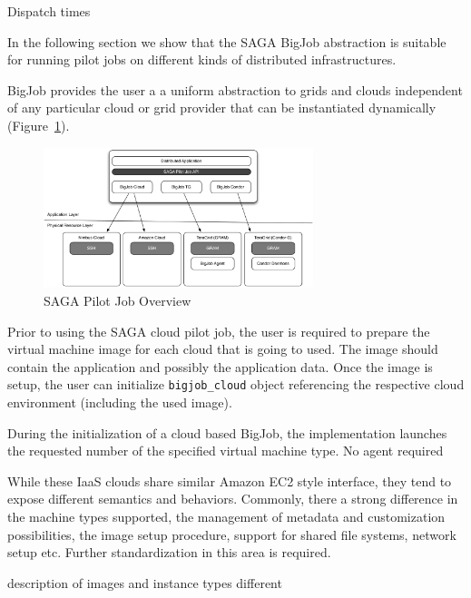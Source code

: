 \documentclass[conference,final]{IEEEtran}
\begin{document}
Dispatch times

In the following section we show that the SAGA BigJob abstraction is suitable for running pilot jobs on
different kinds of distributed infrastructures.




BigJob provides the user a a uniform abstraction to grids and clouds independent of 
any particular cloud or grid provider that can be instantiated dynamically 
(Figure~\ref{fig:figures_distributed_pilot_job}).

\begin{figure}[htbp]
    \centering
        \includegraphics[width=0.7\textwidth]{figures/distributed_pilot_job.pdf}
    \caption{SAGA Pilot Job Overview}
    \label{fig:figures_distributed_pilot_job}
\end{figure}

Prior to using the SAGA cloud pilot job, the user is required to prepare the virtual machine
image for each cloud that is going to used. The image should contain the application and possibly
the application data. Once the image is setup, the user can initialize \texttt{bigjob\_cloud} object referencing
the respective cloud environment (including the used image).

During the initialization of a cloud based BigJob, the implementation launches the requested
number of the specified virtual machine type.
No agent required

While these IaaS clouds share similar Amazon EC2 style interface, they tend to expose
different semantics and behaviors. Commonly, there a strong difference in the machine 
types supported, the management of metadata and customization possibilities, the image
setup procedure, support for shared file systems, network setup etc. Further standardization
in this area is required.


description of images and instance types different
\end{document}
